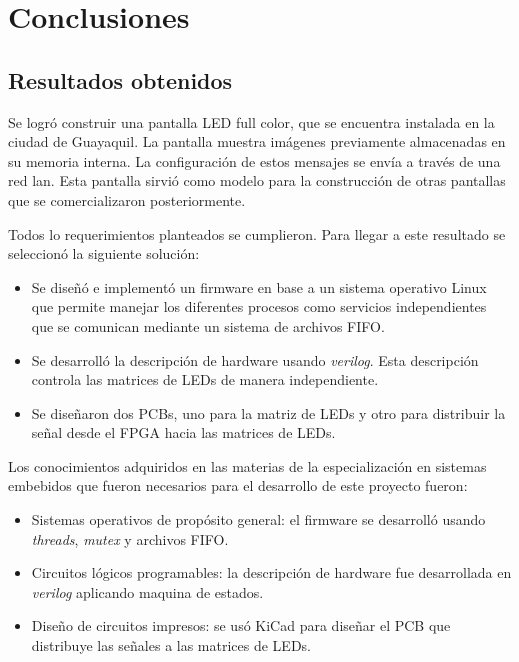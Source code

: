 
\chapter{Conclusiones} %

\label{Chapter5} %



\section{Resultados obtenidos}




Se logró construir una pantalla LED full color, que se encuentra instalada en la ciudad de Guayaquil. La pantalla muestra imágenes previamente almacenadas en su memoria interna. La configuración de estos mensajes se envía a través de una red lan. Esta pantalla sirvió como modelo para la construcción de otras pantallas que se comercializaron posteriormente.

Todos lo requerimientos planteados se cumplieron. Para llegar a este resultado se seleccionó la siguiente solución:
\begin{itemize}
\item Se diseñó e implementó un firmware en base a un sistema operativo Linux que permite manejar los diferentes procesos como servicios independientes que se comunican mediante un sistema de archivos FIFO.
\item Se desarrolló la descripción de hardware usando \textit{verilog}.  Esta descripción controla las matrices de LEDs de manera independiente.
\item Se diseñaron dos PCBs, uno para la matriz de LEDs y otro para distribuir la señal desde el FPGA hacia las matrices de LEDs.
\end{itemize}
Los conocimientos adquiridos en las materias de la especialización en sistemas embebidos que fueron necesarios para el desarrollo de este proyecto fueron:
\begin{itemize}
\item Sistemas operativos de propósito general: el firmware se desarrolló usando \textit{threads}, \textit{mutex} y archivos FIFO.
\item Circuitos lógicos programables: la descripción de hardware fue desarrollada en \textit{verilog} aplicando maquina de estados.
\item Diseño de circuitos impresos: se usó KiCad para diseñar el PCB que distribuye las señales a las matrices de LEDs.
\end{itemize}


